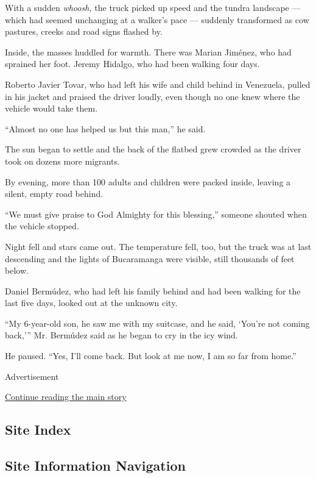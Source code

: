 With a sudden \emph{whoosh,} the truck picked up speed and the tundra
landscape --- which had seemed unchanging at a walker's pace ---
suddenly transformed as cow pastures, creeks and road signs flashed by.

Inside, the masses huddled for warmth. There was Marian Jiménez, who had
sprained her foot. Jeremy Hidalgo, who had been walking four days.

Roberto Javier Tovar, who had left his wife and child behind in
Venezuela, pulled in his jacket and praised the driver loudly, even
though no one knew where the vehicle would take them.

``Almost no one has helped us but this man,'' he said.

The sun began to settle and the back of the flatbed grew crowded as the
driver took on dozens more migrants.

By evening, more than 100 adults and children were packed inside,
leaving a silent, empty road behind.

``We must give praise to God Almighty for this blessing,'' someone
shouted when the vehicle stopped.

Night fell and stars came out. The temperature fell, too, but the truck
was at last descending and the lights of Bucaramanga were visible, still
thousands of feet below.

Daniel Bermúdez, who had left his family behind and had been walking for
the last five days, looked out at the unknown city.

``My 6-year-old son, he saw me with my suitcase, and he said, `You're
not coming back,''' Mr. Bermúdez said as he began to cry in the icy
wind.

He paused. ``Yes, I'll come back. But look at me now, I am so far from
home.''

Advertisement

\protect\hyperlink{after-bottom}{Continue reading the main story}

\hypertarget{site-index}{%
\subsection{Site Index}\label{site-index}}

\hypertarget{site-information-navigation}{%
\subsection{Site Information
Navigation}\label{site-information-navigation}}

